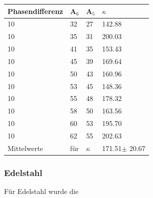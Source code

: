 \begin{minipage}{\linewidth}
    \begin{table}[H]
        \centering
    \begin{tabular}{llll}
        \toprule
        Phasendifferenz & A$_6$ & A$_5$ & $\kappa$  \\
        \midrule
        10 & 32 & 27 & 142.88 \\
        10 & 35 & 31 & 200.03 \\
        10 & 41 & 35 & 153.43 \\
        10 & 45 & 39 & 169.64 \\
        10 & 50 & 43 & 160.96 \\
        10 & 53 & 45 & 148.36 \\
        10 & 55 & 48 & 178.32 \\
        10 & 58 & 50 & 163.56 \\
        10 & 60 & 53 & 195.70 \\
        10 & 62 & 55 & 202.63 \\
        \midrule
        Mittelwerte&für&$\kappa$&171.51$\pm$ 20.67\\
        \bottomrule   
    \end{tabular}
\end{table}
\end{minipage}



\subsubsection{Edelstahl}

Für Edelstahl wurde die 